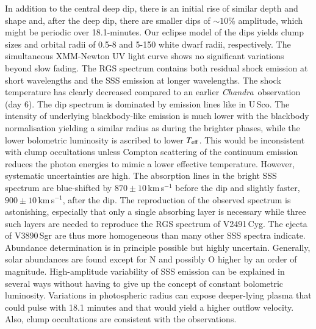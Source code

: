 \documentclass{aa}
\newcommand{\chandra}{{\it Chandra}}
\begin{document}
   {
In addition to the central deep dip, there is an initial rise of similar
depth and shape and, after the deep dip, there are smaller dips of
$\sim 10$\% amplitude, which might be periodic over 18.1-minutes.
Our eclipse model of the dips yields clump sizes and orbital radii of
0.5-8 and 5-150 white dwarf radii, respectively. The simultaneous
XMM-Newton UV light curve shows no significant variations beyond slow fading.
The RGS spectrum contains both residual shock emission at short
wavelengths and the SSS emission at longer wavelengths. The shock
temperature has clearly decreased compared to an earlier \chandra\
observation (day 6). The dip spectrum is dominated by emission lines
like in U\,Sco. The intensity of underlying blackbody-like
emission is much lower with the blackbody normalisation yielding
a similar radius as during the brighter phases, while the lower
bolometric luminosity is ascribed to lower $T_{\rm eff}$. This would
be inconsistent with clump occultations unless Compton scattering of
the continuum emission reduces the photon energies to mimic a lower
effective temperature. However, systematic uncertainties are high.
The absorption lines in the bright SSS spectrum are blue-shifted by
$870\pm10$\,km\,s$^{-1}$ before the dip and slightly faster,
$900\pm10$\,km\,s$^{-1}$, after the dip. The reproduction of the
observed spectrum is astonishing, especially that only a single absorbing
layer is necessary while three such layers are needed to reproduce
the RGS spectrum of V2491\,Cyg. The ejecta of V3890\,Sgr are thus more
homogeneous than many other SSS spectra indicate.
Abundance determination is in principle possible but highly uncertain.
Generally, solar abundances are found except for N and possibly O higher
by an order of magnitude.
   }
   {
High-amplitude variability of SSS emission can be explained in several
ways without having to give up the concept of constant bolometric luminosity.
Variations in photospheric radius can expose deeper-lying plasma that could
pulse with 18.1 minutes and that would yield a higher outflow velocity. Also,
clump occultations are consistent with the observations.
    }

   \maketitle

%
\end{document}

